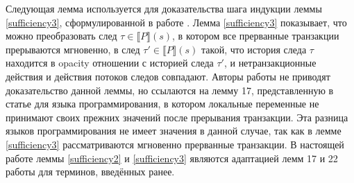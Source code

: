 Следующая лемма используется для доказательства шага индукции леммы \ref{sufficiency3}, сформулированной в работе \cite{tms_article}. Лемма \ref{sufficiency3} показывает, что можно преобразовать след $\tau \in \llbracket P \rrbracket(s)$, в котором все прерванные транзакции прерываются мгновенно, в след $\tau' \in \llbracket P \rrbracket(s)$ такой, что история следа $\tau$ находится в opacity отношении с историей следа $\tau'$, и  нетранзакционные действия и действия потоков следов совпадают. Авторы работы не приводят доказательство данной леммы, но ссылаются на лемму 17, представленную в статье \cite{opacity_article} для языка программирования, в котором локальные переменные не принимают своих прежних значений после прерывания транзакции. Эта разница языков программирования не имеет значения в данной случае, так как в лемме \ref{sufficiency3} рассматриваются мгновенно прерванные транзакции. В настоящей работе леммы \ref{sufficiency2} и \ref{sufficiency3} являются адаптацией лемм 17 и 22 работы \cite{opacity_article} для терминов, введённых ранее. 

